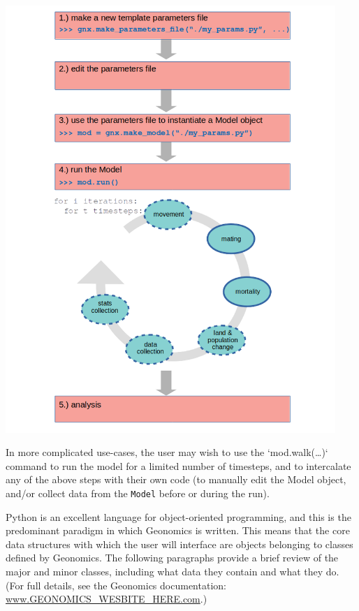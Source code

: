 ﻿\documentclass{article}
\begin{document}
\includegraphics[width=125mm]{./img/flow_diagram.png}

In more complicated use-cases, the user may wish to use the `mod.walk(\ldots)`
command to run the model for a limited number of timesteps,
and to intercalate any of the above steps with their own code
(to manually edit the Model object, and/or collect data from the \texttt{Model} before or
during the run).

Python is an excellent language for object-oriented programming,
and this is the predominant paradigm in which Geonomics is written.
This means that the core data structures with which the user will interface
are objects belonging to classes defined by Geonomics.
The following paragraphs provide a brief review of the major and minor classes, including
what data they contain and what they do. (For full details, see the Geonomics
documentation: \url{www.GEONOMICS\_WESBITE\_HERE.com}.)
\end{document}
